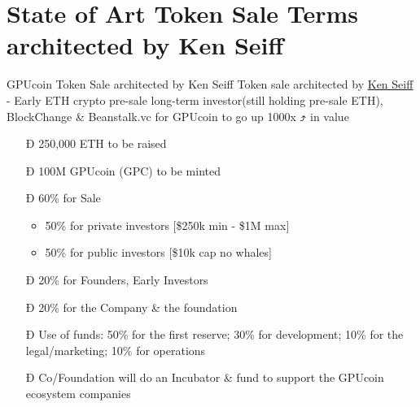 \documentclass[10pt,handout]{beamer}
\begin{document}
\section{State of Art Token Sale Terms architected by Ken Seiff}
\begin{frame}[fragile]{GPUcoin Token Sale architected by Ken Seiff}
Token sale architected by \href{https://beanstalk.vc/}{\underline{Ken Seiff}} - Early ETH crypto pre-sale long-term investor(still holding pre-sale ETH), BlockChange \& Beanstalk.vc for GPUcoin to go up 1000x ⤴ in value


 \begin{itemize}[<+-| alert@+>]%

\item[Ð]{250,000 ETH to be raised}
\item[Ð]100M GPUcoin (GPC) to be minted
\item[Ð]60\% for Sale
\begin{itemize}[<+-| alert@+>]
\item 50\% for private investors [\$250k min - \$1M max]
\item 50\% for public investors [\$10k cap no whales]
\end{itemize}
\item[Ð]{20\% for Founders, Early Investors}
\item[Ð]{20\% for the Company \& the foundation}
\item[Ð]{Use of funds: 50\% for the first reserve; 30\% for development; 10\% for the legal/marketing; 10\% for operations}
\item[Ð]{Co/Foundation will do an Incubator \& fund to support the GPUcoin ecosystem companies}
\end{itemize}

\end{frame}
\end{document}
